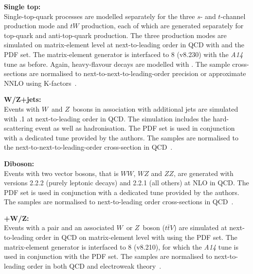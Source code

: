 \textbf{Single top:}\\
Single-top-quark processes are modelled separately for the three $s$- and $t$-channel production mode and $tW$ production, 
each of which are generated separately for top-quark and anti-top-quark production. The three production modes are simulated on matrix-element level at next-to-leading order in QCD with \powhegbox and the \nnpdflo PDF set. The matrix-element generator is interfaced to \pythia{}8 (v8.230) with the \emph{A14} tune as before. Again, heavy-flavour decays are modelled with \evtgen. The sample cross-sections are normalised to next-to-next-to-leading-order precision or approximate NNLO using K-factors~\cite{Kidonakis:2010tc,Kidonakis:2010ux,Kidonakis:2011wy}. 

\textbf{W/Z+jets:}\\
Events with $W$~and $Z$~bosons in association with additional jets are simulated with .1 at next-to-leading order in QCD. The simulation includes the hard-scattering event as well as hadronisation. The \nnpdfnlo PDF set is used in conjunction with a dedicated tune provided by the \sherpa authors. The samples are normalised to the next-to-next-to-leading-order cross-section in QCD~\cite{ATLAS-CONF-2015-039}.

\textbf{Diboson:}\\
Events with two vector bosons, that is $\mathit{WW}$, $\mathit{WZ}$ and $\mathit{ZZ}$, are generated with \sherpa versions 2.2.2 (purely leptonic decays) and 2.2.1 (all others) at NLO in QCD. The \nnpdfnnlo PDF set is used in conjunction with a dedicated tune provided by the \sherpa authors. The samples are normalised to next-to-leading order cross-sections in QCD~\cite{Campbell:1999ah}.

\textbf{\ttbar+W/Z:}\\
Events with a \ttbar pair and an associated $W$~or $Z$~boson ($t\bar{t}V$) are simulated at next-to-leading order in QCD on matrix-element level with \madgraph using the \nnpdfnlo PDF set.
The matrix-element generator is interfaced to \pythia{}8 (v8.210), for which the \emph{A14} tune is used in conjunction with the \nnpdflo PDF set.
The samples are normalised to next-to-leading order in both QCD and electroweak theory~\cite{deFlorian:2016spz}.


